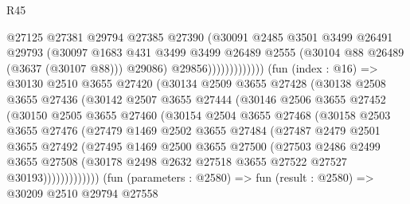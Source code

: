 \begin{lexlean}{R45}
\begin{coremodule}
                                @27125
                                @27381
                                @29794
                                @27385
                                @27390
                                (@30091
                                  @2485
                                  @3501
                                  @3499
                                  @26491
                                  @29793
                                  (@30097
                                    @1683
                                    @431
                                    @3499
                                    @3499
                                    @26489
                                    @2555
                                    (@30104 @88 @26489 (@3637 (@30107 @88)))
                                    @29086)
                                  @29856)))))))))))))
        (fun (index : @16) =>
        @30130
          @2510
          @3655
          @27420
          (@30134
            @2509
            @3655
            @27428
            (@30138
              @2508
              @3655
              @27436
              (@30142
                @2507
                @3655
                @27444
                (@30146
                  @2506
                  @3655
                  @27452
                  (@30150
                    @2505
                    @3655
                    @27460
                    (@30154
                      @2504
                      @3655
                      @27468
                      (@30158
                        @2503
                        @3655
                        @27476
                        (@27479
                          @1469
                          @2502
                          @3655
                          @27484
                          (@27487
                            @2479
                            @2501
                            @3655
                            @27492
                            (@27495
                              @1469
                              @2500
                              @3655
                              @27500
                              (@27503
                                @2486
                                @2499
                                @3655
                                @27508
                                (@30178 @2498 @2632 @27518 @3655 @27522 @27527 @30193)))))))))))))
        (fun (parameters : @2580) =>
        fun (result : @2580) =>
        @30209
          @2510
          @29794
          @27558

\end{coremodule}
\end{lexlean}
